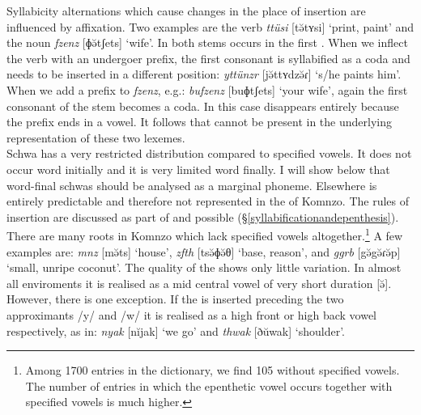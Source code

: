 Syllabicity alternations which cause changes in the place of  insertion are influenced by affixation. Two examples are the verb \emph{ttüsi} [tə̆tʏsi] `print, paint' and the noun \emph{fzenz} [ɸə̆tʃets] `wife'. In both stems  occurs in the first . When we inflect the verb with an undergoer prefix, the first consonant is syllabified as a coda and  needs to be inserted in a different position: \emph{yttünzr} [jə̆ttʏdzə̆ɾ] `s/he paints him'. When we add a  prefix to \emph{fzenz}, e.g.: \emph{bufzenz} [buɸtʃets] `your wife', again the first consonant of the stem becomes a coda. In this case  disappears entirely because the  prefix ends in a vowel. It follows that  cannot be present in the underlying representation of these two lexemes.\\

Schwa has a very restricted distribution compared to specified vowels. It does not occur word initially and it is very limited word finally. I will show below that word-final schwas should be analysed as a marginal phoneme. Elsewhere  is entirely predictable and therefore not represented in the  of Komnzo. The rules of  insertion are discussed as part of  and possible  (\S{}\ref{syllabificationandepenthesis}). There are many roots in Komnzo which lack specified vowels altogether.\footnote{Among 1700 entries in the dictionary, we find 105 without specified vowels. The number of entries in which the epenthetic vowel occurs together with specified vowels is much higher.} A few examples are: \emph{mnz} [mə̆ts] `house', \emph{zfth} [tsə̆ɸə̆θ] `base, reason', and \emph{ggrb} [gə̆gə̆ɾə̆p] `small, unripe coconut'. The quality of the  shows only little variation. In almost all enviroments it is realised as a mid central vowel of very short duration [ə̆]. However, there is one exception. If the  is inserted preceding the two approximants /y/ and /w/ it is realised as a high front or high back vowel respectively, as in: \emph{nyak} [nĭjak] `we go' and \emph{thwak} [ðŭwak] `shoulder'.\\

